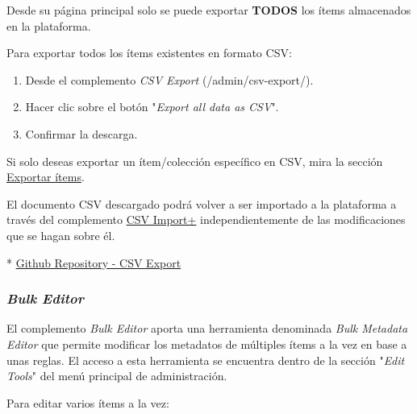 \documentclass[
]{article}
\providecommand{\tightlist}{%
  \setlength{\itemsep}{0pt}\setlength{\parskip}{0pt}}
\begin{document}
Desde su página principal solo se puede exportar \textbf{TODOS} los
ítems almacenados en la plataforma.

Para exportar todos los ítems existentes en formato CSV:

\begin{enumerate}
\def\labelenumi{\arabic{enumi}.}
\tightlist
\item
  Desde el complemento \emph{CSV Export} ({/admin/csv-export/}).
\item
  Hacer clic sobre el botón "\emph{Export all data as CSV}".
\item
  Confirmar la descarga.
\end{enumerate}

Si solo deseas exportar un ítem/colección específico en CSV, mira la
sección \protect\hyperlink{exportar-uxedtems}{Exportar ítems}.

El documento CSV descargado podrá volver a ser importado a la plataforma
a través del complemento \protect\hyperlink{csv-import}{CSV Import+}
independientemente de las modificaciones que se hagan sobre él.

*
\href{https://github.com/gcm1001/TFG-CeniehAriadne/tree/master/omeka/plugins/AriadnePlusTracking}{Github
Repository - CSV Export}

\hypertarget{bulk-editor}{%
\subsubsection{\texorpdfstring{\emph{Bulk
Editor}}{Bulk Editor}}\label{bulk-editor}}

El complemento \emph{Bulk Editor} aporta una herramienta denominada
\emph{Bulk Metadata Editor} que permite modificar los metadatos de
múltiples ítems a la vez en base a unas reglas. El acceso a esta
herramienta se encuentra dentro de la sección "\emph{Edit Tools}" del
menú principal de administración.

Para editar varios ítems a la vez:
\end{document}
